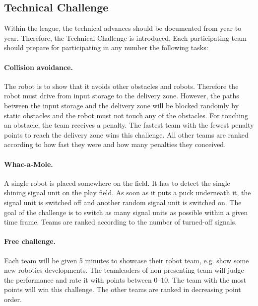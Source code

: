 \documentclass[12pt,twoside]{article}
\newenvironment{rulechange}{}{}
\begin{document}
\begin{rulechange}
  \subsection{Technical Challenge}
  
  Within the league, the technical advances should be documented from
  year to year. Therefore, the Technical Challenge is introduced.
  Each participating team should prepare for participating in any
  number the following tasks:


  \paragraph{Collision avoidance.~}
  The robot is to show that it avoids other obstacles and robots.
  Therefore the robot must drive from input storage to the delivery zone.
  However, the paths between the input storage and the delivery zone will
  be blocked randomly by static obstacles and the robot must not touch any
  of the obstacles. For touching an obstacle, the team receives a penalty.
  The fastest team with the fewest penalty points to reach the delivery
  zone wins this challenge. All other teams are ranked according to
  how fast they were and how many penalties they conceived.
  
  \paragraph{Whac-a-Mole.~}
  A single robot is placed somewhere on the field. It has to detect
  the single shining signal unit on the play field. As soon as it puts
  a puck underneath it, the signal unit is switched off and another
  random signal unit is switched on. The goal of the challenge is to
  switch as many signal units as possible within a given time
  frame. Teams are ranked according to the number of turned-off
  signals.
  
  \paragraph{Free challenge.~}
  Each team will be given 5 minutes to showcase their robot team, e.g.
  show some new robotics developments. The teamleaders of
  non-presenting team will judge the performance and rate it with
  points between 0--10.  The team with the most points will win this
  challenge. The other teams are ranked in decreasing point order.



\end{rulechange}
\end{document}
